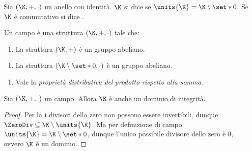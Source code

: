 \begin{definition}
    Sia $(\K, +, \cdot)$ un anello con identità.  $\K$ si dice  se $\units{\K} = \K \setminus \set*{0}$. Se $\K$ è commutativo si dice .
\end{definition}

\begin{remark}
    Un campo è una struttura $(\K, +, \cdot)$ tale che: 
    \begin{enumerate}[label={(S)}]
        \item La struttura $(\K, +)$ è un gruppo abeliano.
    \end{enumerate}
    \begin{enumerate}[label={(P)}]
        \item La struttura $(\K\setminus \set*{0}, \cdot)$ è un gruppo abeliano.
    \end{enumerate}
    \begin{enumerate}[label=(D)]
        \item \label{def:campo:distr} Vale la \emph{proprietà distributiva del prodotto rispetto alla somma}.
    \end{enumerate}
\end{remark}

\begin{proposition}
     Sia $(\K, +, \cdot)$ un campo. Allora $\K$ è anche un dominio di integrità.
\end{proposition}
\begin{proof}
    Per la  i divisori dello zero non possono essere invertibili, dunque $\ZeroDiv \subseteq \K \setminus \units{\K}$. Ma per definizione di campo $\units{\K} = \K \setminus \set*{0}$, dunque l'unico possibile divisore dello zero è $0$, ovvero $\K$ è un dominio.
\end{proof}

